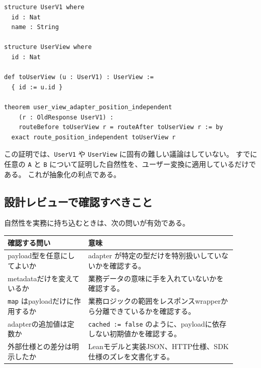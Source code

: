 \begin{listing}[htbp]
\begin{verbatim}
structure UserV1 where
  id : Nat
  name : String

structure UserView where
  id : Nat

def toUserView (u : UserV1) : UserView :=
  { id := u.id }

theorem user_view_adapter_position_independent
    (r : OldResponse UserV1) :
    routeBefore toUserView r = routeAfter toUserView r := by
  exact route_position_independent toUserView r
\end{verbatim}
\caption{ユーザーpayload変換に特化した自然性}
\label{lst:ch25-user-view}
\end{listing}

この証明では、\texttt{UserV1} や \texttt{UserView} に固有の難しい議論はしていない。
すでに任意の \texttt{A} と \texttt{B} について証明した自然性を、ユーザー変換に適用しているだけである。
これが抽象化の利点である。

\subsection{設計レビューで確認すべきこと}

自然性を実務に持ち込むときは、次の問いが有効である。

\begin{center}
\begin{tabular}{p{0.31\linewidth}p{0.58\linewidth}}
\toprule
確認する問い & 意味 \\
\midrule
payload型を任意にしてよいか & adapter が特定の型だけを特別扱いしていないかを確認する。 \\
metadataだけを変えているか & 業務データの意味に手を入れていないかを確認する。 \\
\texttt{map} はpayloadだけに作用するか & 業務ロジックの範囲をレスポンスwrapperから分離できているかを確認する。 \\
adapterの追加値は定数か & \texttt{cached := false} のように、payloadに依存しない初期値かを確認する。 \\
外部仕様との差分は明示したか & Leanモデルと実装JSON、HTTP仕様、SDK仕様のズレを文書化する。 \\
\bottomrule
\end{tabular}
\end{center}


